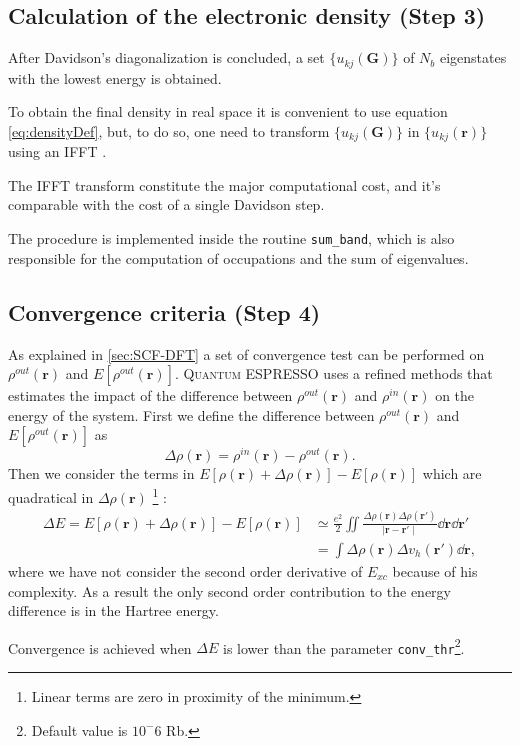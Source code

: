 \documentclass[a4paper,12pt]{article}
\newcommand\dens{\rho(\mathbf{r})}
\newcommand\densin{\rho^{in}(\mathbf{r})}
\newcommand\densout{\rho^{out}(\mathbf{r})}
\newcommand\erre{\mathbf{r}}
\newcommand\GI{\mathbf{G}}
\newcommand\QE{\textsc{Quantum} ESPRESSO }
\begin{document}
\subsection{Calculation of the electronic density (Step 3)}

After Davidson's diagonalization is concluded, a set $\{ u_{kj}(\GI) \}$ of $N_{b}$ eigenstates with the lowest energy is obtained.

To obtain the final density in real space it is convenient to use equation \eqref{eq:densityDef}, but, to do so, one need to transform $\{ u_{kj}(\GI) \}$ in $\{ u_{kj}(\erre) \}$ using an IFFT \cite[p.246]{Martin}.

The IFFT transform constitute the major computational cost, and it's comparable with the cost of a single Davidson step.

The procedure is implemented inside the routine \texttt{sum\_band}, which is also responsible for the computation of occupations and the sum of eigenvalues.


\subsection{Convergence criteria (Step 4)}\label{sec:SCFConvergence}
As explained in \ref{sec:SCF-DFT} a set of convergence test can be performed on $\densout$ and $E[\densout]$.
\QE uses a refined methods that estimates the impact of the difference between $\densout$ and $\densin$ on the energy of the system.
First we define the difference between $\densout$ and $E[\densout]$ as 
\begin{equation}
	\Delta\dens = \densin - \densout.
\end{equation}
Then we consider the terms in $E[\dens + \Delta\dens] - E[\dens ]$ which are quadratical in $\Delta\dens$ \footnote{Linear terms are zero in proximity of the minimum.} :
\begin{align}
	\Delta E = E[\dens + \Delta\dens] - E[\dens ] &\simeq \frac{e^2}{2} \iint \frac{\Delta\rho(\erre) \Delta\rho(\erre')}{\mid \erre - \erre' \mid} \dd{\erre} \dd{\erre'}\\
	 &= \int \Delta\dens \Delta v_{h}(\erre') \dd{\erre},
\end{align}
where we have not consider the second order derivative of $E_{xc}$ because of his complexity.
As a result the only second order contribution to the energy difference is in the Hartree energy.

Convergence is achieved when $\Delta E$ is lower than the parameter \texttt{conv\_thr}\footnote{Default value is $10^-6$ Rb.}.
\end{document}
